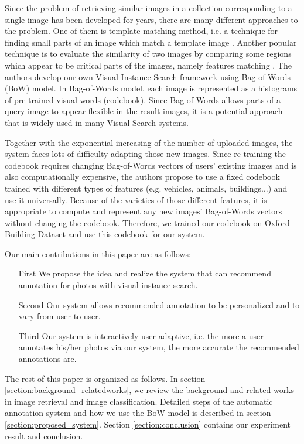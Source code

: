 Since the problem of retrieving similar images in a collection corresponding to a single image has been developed for years, there are many different approaches to the problem. One of them is template matching method, i.e. a technique for finding small parts of an image which match a template image \cite{brunelli_template_matching,Rosenfeld4309663,Gharavi913587}. Another popular technique is to evaluate the similarity of two images by comparing some regions which appear to be critical parts of the images, namely features matching \cite{Belongie710790,Rubner,Viola990517}. The authors develop our own Visual Instance Search framework using Bag-of-Words (BoW) model. In Bag-of-Words model, each image is represented as a histograms of pre-trained visual words (codebook). Since Bag-of-Words allows parts of a query image to appear flexible in the result images, it is a potential approach that is widely used in many Visual Search systems. 

Together with the exponential increasing of the number of uploaded images, the system faces lots of difficulty adapting those new images. Since re-training the codebook requires changing Bag-of-Words vectors of users' existing images and is also computationally expensive, the authors propose to use a fixed codebook trained with different types of features (e.g. vehicles, animals, buildings...) and use it universally. Because of the varieties of those different features, it is appropriate to compute and represent any new images' Bag-of-Words vectors without changing the codebook. Therefore, we trained our codebook on Oxford Building Dataset and use this codebook for our system.

Our main contributions in this paper are as follows:
\begin{enumerate}
	\item[First] We propose the idea and realize the system that can recommend annotation for photos with visual instance search.
	\item[Second] Our system allows recommended annotation to be personalized and to vary from user to user.
	\item[Third] Our system is interactively user adaptive, i.e. the more a user annotates his/her photos via our system, the more accurate the recommended annotations are.
\end{enumerate}

The rest of this paper is organized as follows. In section \ref{section:background_relatedworks}, we review the background and related works in image retrieval and image classification. Detailed steps of the automatic annotation system and how we use the BoW model is described in section \ref{section:proposed_system}. Section \ref{section:conclusion} contains our experiment result and conclusion.
